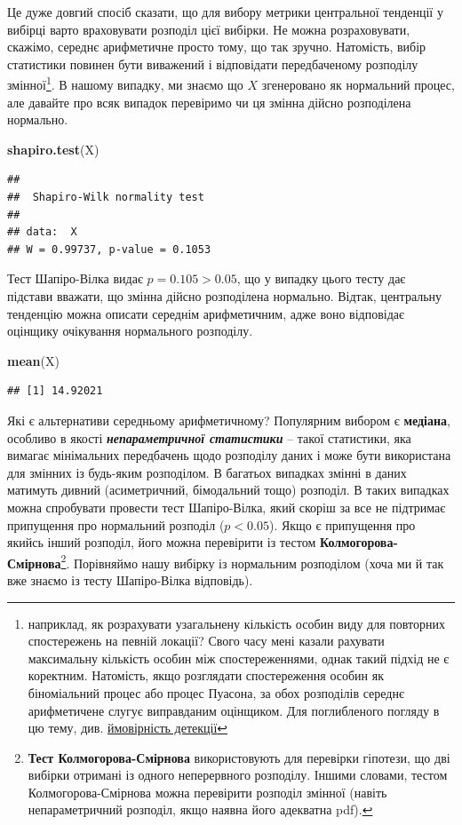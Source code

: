 \documentclass[
  11pt,
]{book}
\newenvironment{Shaded}{\begin{snugshade}}{\end{snugshade}}
\newcommand{\FunctionTok}[1]{\textcolor[rgb]{0.13,0.29,0.53}{\textbf{#1}}}
\newcommand{\NormalTok}[1]{#1}
\begin{document}
Це дуже довгий спосіб сказати, що для вибору метрики центральної тенденції у вибірці варто враховувати розподіл цієї вибірки. Не можна розраховувати, скажімо, середнє арифметичне просто тому, що так зручно. Натомість, вибір статистики повинен бути виважений і відповідати передбаченому розподілу змінної\footnote{наприклад, як розрахувати узагальнену кількість особин виду для повторних спостережень на певній локації? Свого часу мені казали рахувати максимальну кількість особин між спостереженнями, однак такий підхід не є коректним. Натомість, якщо розглядати спостереження особин як біноміальний процес або процес Пуасона, за обох розподілів середнє арифметичене слугує виправданим оцінщиком. Для поглибленого погляду в цю тему, див. \hyperref[detectability]{ймовірність детекції}}. В нашому випадку, ми знаємо що \(X\) згенеровано як нормальний процес, але давайте про всяк випадок перевіримо чи ця змінна дійсно розподілена нормально.

\begin{Shaded}
\begin{Highlighting}[]
\FunctionTok{shapiro.test}\NormalTok{(X)}
\end{Highlighting}
\end{Shaded}

\begin{verbatim}
## 
##  Shapiro-Wilk normality test
## 
## data:  X
## W = 0.99737, p-value = 0.1053
\end{verbatim}

Тест Шапіро-Вілка видає \(p = 0.105 > 0.05\), що у випадку цього тесту дає підстави вважати, що змінна дійсно розподілена нормально. Відтак, центральну тенденцію можна описати середнім арифметичним, адже воно відповідає оцінщику очікування нормального розподілу.

\begin{Shaded}
\begin{Highlighting}[]
\FunctionTok{mean}\NormalTok{(X)}
\end{Highlighting}
\end{Shaded}

\begin{verbatim}
## [1] 14.92021
\end{verbatim}

Які є альтернативи середньому арифметичному? Популярним вибором є \textbf{медіана}, особливо в якості \textbf{\emph{непараметричної статистики}} -- такої статистики, яка вимагає мінімальних передбачень щодо розподілу даних і може бути використана для змінних із будь-яким розподілом. В багатьох випадках змінні в даних матимуть дивний (асиметричний, бімодальний тощо) розподіл. В таких випадках можна спробувати провести тест Шапіро-Вілка, який скоріш за все не підтримає припущення про нормальний розподіл (\(p < 0.05\)). Якщо є припущення про якийсь інший розподіл, його можна перевірити із тестом \textbf{Колмогорова-Смірнова}\footnote{\textbf{Тест Колмогорова-Смірнова} використовують для перевірки гіпотези, що дві вибірки отримані із одного неперервного розподілу. Іншими словами, тестом Колмогорова-Смірнова можна перевірити розподіл змінної (навіть непараметричний розподіл, якщо наявна його адекватна pdf).}. Порівняймо нашу вибірку із нормальним розподілом (хоча ми й так вже знаємо із тесту Шапіро-Вілка відповідь).
\end{document}
